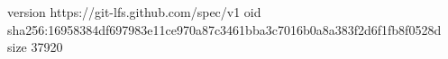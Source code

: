 version https://git-lfs.github.com/spec/v1
oid sha256:16958384df697983e11ce970a87c3461bba3c7016b0a8a383f2d6f1fb8f0528d
size 37920
